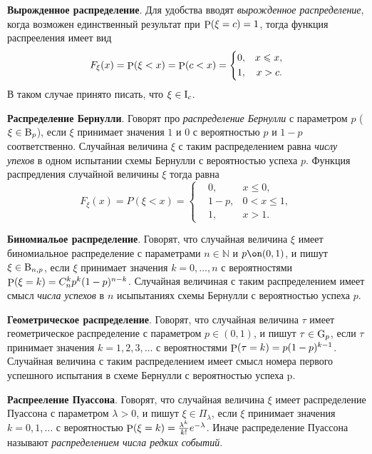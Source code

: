\textbf{Вырожденное распределение}. 
Для удобства вводят \textit{вырожденное распределение}, когда возможен единственный результат при $\P (\xi = c)=1$, тогда функция распрееления имеет вид
\begin{equation*}
    F_\xi (x) = \P (\xi < x) = \P(c < x) = \left\{\begin{aligned}
        &0, &x \leq x, \\
        &1, &x > c.
    \end{aligned}\right.
\end{equation*}
В таком случае принято писать, что $\xi \in \textnormal{I}_c$.


\textbf{Распределение Бернулли}.
Говорят про \textit{распределение Бернулли} с параметром $p$ ($\xi \in \textnormal{B}_p$), если $\xi$ принимает значения $1$ и $0$ с вероятностью $p$ и $1-p$ соответственно. Случайная величина $\xi$ с таким распределением равна \textit{числу упехов} в одном испытании схемы Бернулли с вероятностью успеха $p$. Функция распредления случайной величины $\xi$ тогда равна
\begin{equation*}
    F_\xi (x) = P(\xi < x) = \left\{\begin{aligned}
        &0, &x \leq 0, \\
        &1-p, &0 < x \leq 1, \\
        &1, &x > 1.
    \end{aligned}\right.
\end{equation*}


\textbf{Биномиальое распределение}. 
Говорят, что случайная величина $\xi$ имеет биномиальное распределение с параметрами $n \in \mathbb{N}$ и $p \on (0, 1)$, и пишут $\xi \in \textnormal{B}_{n,p}$, если $\xi$ принимает значения $k = 0, \ldots, n$ с вероятностями $\P (\xi = k) = C_n^k p^k (1-p)^{n-k}$. Случайная величиная с таким распределением имеет смысл \textit{числа успехов} в $n$ исыпытаниях схемы Бернулли с вероятностью успеха $p$. 

\textbf{Геометрическое распределение}.
Говорят, что случайная величина $\tau$ имеет геометрическое распределение с параметром $p \in (0, 1)$, и пишут $\tau \in \textnormal{G}_p$, если $\tau$ принимает значения $k =1, 2, 3, \ldots$ с вероятностями $\P(\tau = k) = p (1-p)^{k-1}$. 
Случайная величина с таким распределением имеет смысл номера первого успешного испытания в схеме Бернулли с вероятностью успеха p.



\textbf{Распрееление Пуассона}. Говорят, что случайная величина $\xi$ имеет распределение Пуассона с параметром $\lambda > 0$, и пишут $\xi \in \Pi_\lambda$, если $\xi$ принимает значения $k = 0, 1, \ldots$ с вероятностью $\P(\xi = k) = \frac{\lambda^k}{k!} e^{-\lambda}$. Иначе распределение Пуассона называют \textit{распределением числа редких событий}. 


